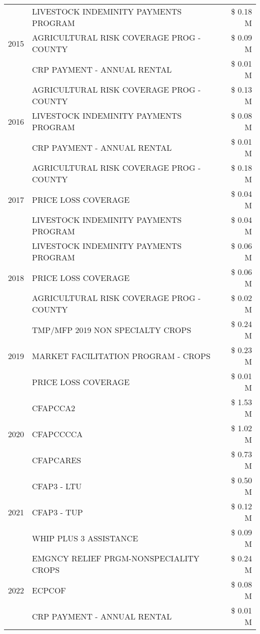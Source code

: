 \begin{tabular}{llr}
\cline{1-3}
\multirow[t]{3}{*}{2015} & LIVESTOCK INDEMINITY PAYMENTS PROGRAM & \$ 0.18 M \\
 & AGRICULTURAL RISK COVERAGE PROG - COUNTY & \$ 0.09 M \\
 & CRP PAYMENT - ANNUAL RENTAL & \$ 0.01 M \\
\cline{1-3}
\multirow[t]{3}{*}{2016} & AGRICULTURAL RISK COVERAGE PROG - COUNTY & \$ 0.13 M \\
 & LIVESTOCK INDEMINITY PAYMENTS PROGRAM & \$ 0.08 M \\
 & CRP PAYMENT - ANNUAL RENTAL & \$ 0.01 M \\
\cline{1-3}
\multirow[t]{3}{*}{2017} & AGRICULTURAL RISK COVERAGE PROG - COUNTY & \$ 0.18 M \\
 & PRICE LOSS COVERAGE & \$ 0.04 M \\
 & LIVESTOCK INDEMINITY PAYMENTS PROGRAM & \$ 0.04 M \\
\cline{1-3}
\multirow[t]{3}{*}{2018} & LIVESTOCK INDEMINITY PAYMENTS PROGRAM & \$ 0.06 M \\
 & PRICE LOSS COVERAGE & \$ 0.06 M \\
 & AGRICULTURAL RISK COVERAGE PROG - COUNTY & \$ 0.02 M \\
\cline{1-3}
\multirow[t]{3}{*}{2019} & TMP/MFP 2019 NON SPECIALTY CROPS & \$ 0.24 M \\
 & MARKET FACILITATION PROGRAM - CROPS & \$ 0.23 M \\
 & PRICE LOSS COVERAGE & \$ 0.01 M \\
\cline{1-3}
\multirow[t]{3}{*}{2020} & CFAPCCA2 & \$ 1.53 M \\
 & CFAPCCCCA & \$ 1.02 M \\
 & CFAPCARES & \$ 0.73 M \\
\cline{1-3}
\multirow[t]{3}{*}{2021} & CFAP3 - LTU & \$ 0.50 M \\
 & CFAP3 - TUP & \$ 0.12 M \\
 & WHIP PLUS 3 ASSISTANCE & \$ 0.09 M \\
\cline{1-3}
\multirow[t]{3}{*}{2022} & EMGNCY RELIEF PRGM-NONSPECIALITY CROPS & \$ 0.24 M \\
 & ECPCOF & \$ 0.08 M \\
 & CRP PAYMENT - ANNUAL RENTAL & \$ 0.01 M \\
\cline{1-3}
\bottomrule
\end{tabular}
